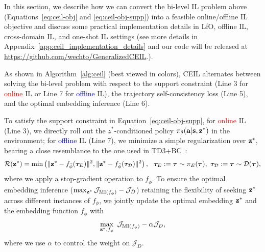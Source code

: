 In this section, we describe how we can convert the bi-level IL problem above (Equations~\ref{eq:ceil-obj} and \ref{eq:ceil-obj-supp}) into a feasible online/offline IL objective and discuss some practical implementation details in LfO, offline IL, cross-domain IL, and one-shot IL settings ({see more details in Appendix~\ref{app:ceil_implementation_details} and our code will be released at \url{https://github.com/wechto/GeneralizedCEIL}.}). 


As shown in Algorithm~\ref{alg:ceil} (best viewed in colors), CEIL alternates between solving the bi-level problem with respect to the support constraint (Line 3 for \textcolor{red}{online} IL or Line 7 for \textcolor{blue}{offline} IL), the trajectory self-consistency loss (Line 5), and the optimal embedding inference (Line 6). 

To satisfy the support constraint in Equation~\ref{eq:ceil-obj-supp}, for \textcolor{red}{online} IL (Line 3), we directly roll out the $z^*$-conditioned policy $\pi_\theta(\mathbf{a}|\mathbf{s},{\mathbf{z}}^*)$ in the environment; for \textcolor{blue}{offline} IL (Line 7), we minimize a simple regularization over ${\mathbf{z}}^*$, bearing a close resemblance to the one used in TD3+BC~\citep{fujimoto2021minimalist}:  
\begin{align}\label{eq:ceil-stop-grad}
    \mathcal{R}({\mathbf{z}}^*) = \min \left( \Vert {\mathbf{z}}^* - f_{\bar{\phi}}({\bm{\tau}}_E)\Vert^2 ,
     \Vert {\mathbf{z}}^* - f_{\bar{\phi}}({\bm{\tau}}_\mathcal{D})\Vert^2 
 \right), \ \ {\bm{\tau}}_E:={\bm{\tau}} \sim \pi_E({\bm{\tau}}), \  {\bm{\tau}}_\mathcal{D}:={\bm{\tau}} \sim \mathcal{D}({\bm{\tau}}), 
\end{align}
where we apply a stop-gradient operation to $f_{\bar{\phi}}$. 
To ensure the optimal embedding inference ($\max_{{\mathbf{z}}^*} \mathcal{J}_{\text{MI}(f_\phi)} - \mathcal{J}_{D}$) retaining the flexibility of seeking ${\mathbf{z}}^*$ across different instances of $f_\phi$, 
we jointly update the optimal embedding ${\mathbf{z}}^*$ and the embedding function $f_\phi$ with
\begin{align}\label{eq:ceil-joint-opt}
 \max_{{\mathbf{z}}^*, f_\phi} \  \mathcal{J}_{\text{MI}(f_\phi)} - \alpha \mathcal{J}_{D}, 
\end{align}
where we use $\alpha$ to control the weight on $\mathcal{J}_{D}$. 


